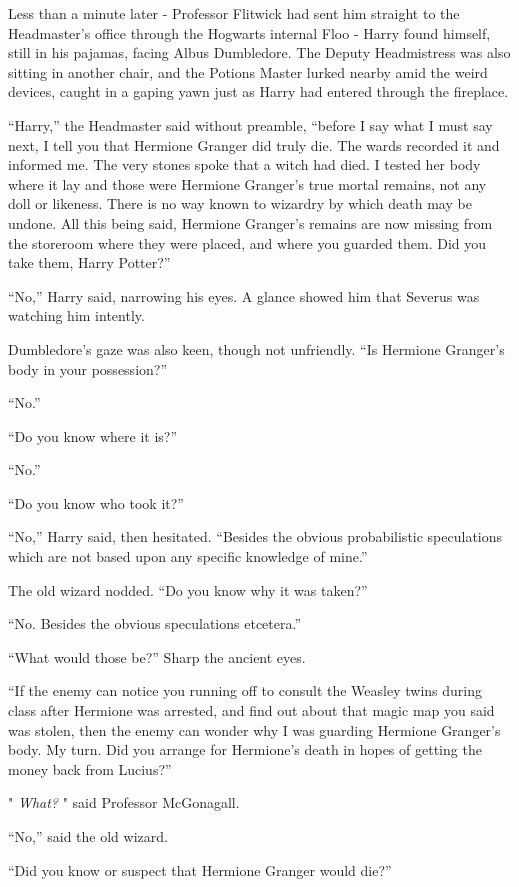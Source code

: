 Less than a minute later - Professor Flitwick had sent him straight to
the Headmaster's office through the Hogwarts internal Floo - Harry found
himself, still in his pajamas, facing Albus Dumbledore. The Deputy
Headmistress was also sitting in another chair, and the Potions Master
lurked nearby amid the weird devices, caught in a gaping yawn just as
Harry had entered through the fireplace.

``Harry,'' the Headmaster said without preamble, ``before I say what I
must say next, I tell you that Hermione Granger did truly die. The wards
recorded it and informed me. The very stones spoke that a witch had
died. I tested her body where it lay and those were Hermione Granger's
true mortal remains, not any doll or likeness. There is no way known to
wizardry by which death may be undone. All this being said, Hermione
Granger's remains are now missing from the storeroom where they were
placed, and where you guarded them. Did you take them, Harry Potter?''

``No,'' Harry said, narrowing his eyes. A glance showed him that Severus
was watching him intently.

Dumbledore's gaze was also keen, though not unfriendly. ``Is Hermione
Granger's body in your possession?''

``No.''

``Do you know where it is?''

``No.''

``Do you know who took it?''

``No,'' Harry said, then hesitated. ``Besides the obvious probabilistic
speculations which are not based upon any specific knowledge of mine.''

The old wizard nodded. ``Do you know why it was taken?''

``No. Besides the obvious speculations etcetera.''

``What would those be?'' Sharp the ancient eyes.

``If the enemy can notice you running off to consult the Weasley twins
during class after Hermione was arrested, and find out about that magic
map you said was stolen, then the enemy can wonder why I was guarding
Hermione Granger's body. My turn. Did you arrange for Hermione's death
in hopes of getting the money back from Lucius?''

" \emph{What?} " said Professor McGonagall.

``No,'' said the old wizard.

``Did you know or suspect that Hermione Granger would die?''

